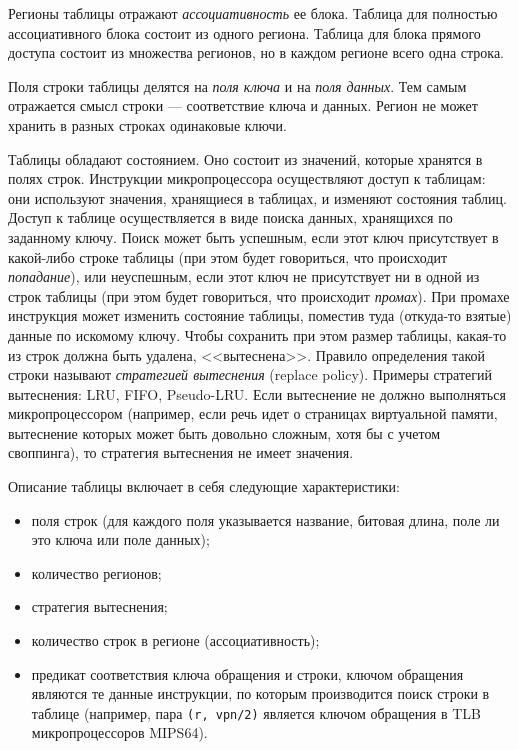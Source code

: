 \documentclass[14pt]{extreport}
\begin{document}
Регионы таблицы отражают \emph{ассоциативность} ее блока. Таблица для полностью ассоциативного блока состоит из одного региона. Таблица для блока прямого доступа состоит из множества регионов, но в каждом регионе всего одна строка.

Поля строки таблицы делятся на \emph{поля ключа} и на \emph{поля данных}. Тем самым отражается смысл строки --- соответствие ключа и данных. Регион не может хранить в разных строках одинаковые ключи.

Таблицы обладают состоянием. Оно состоит из значений, которые хранятся в полях строк. Инструкции микропроцессора осуществляют доступ к таблицам: они используют значения, хранящиеся в таблицах, и изменяют состояния таблиц. Доступ к таблице осуществляется в виде поиска данных, хранящихся по заданному ключу. Поиск может быть успешным, если этот ключ присутствует в какой-либо строке таблицы (при этом будет говориться, что происходит \emph{попадание}), или неуспешным, если этот ключ не присутствует ни в одной из строк таблицы (при этом будет говориться, что происходит \emph{промах}). При промахе инструкция может изменить состояние таблицы, поместив туда (откуда-то взятые) данные по искомому ключу. Чтобы сохранить при этом размер таблицы, какая-то из строк должна быть удалена, <<вытеснена>>. Правило определения такой строки называют \emph{стратегией вытеснения} (replace policy). Примеры стратегий вытеснения: LRU, FIFO, Pseudo-LRU. Если вытеснение не должно выполняться микропроцессором (например, если речь идет о страницах виртуальной памяти, вытеснение которых может быть довольно сложным, хотя бы с учетом своппинга), то стратегия вытеснения не имеет значения.

Описание таблицы включает в себя следующие характеристики:
\begin{itemize}
    \item поля строк (для каждого поля указывается название, битовая длина, поле ли это ключа или поле данных);
    \item количество регионов;
    \item стратегия вытеснения;
    \item количество строк в регионе (ассоциативность);
    \item предикат соответствия ключа обращения и строки, ключом обращения являются те данные инструкции, по которым производится поиск строки в таблице (например, пара \texttt{(r, vpn/2)} является ключом обращения в TLB микропроцессоров MIPS64).
\end{itemize}
\end{document}

